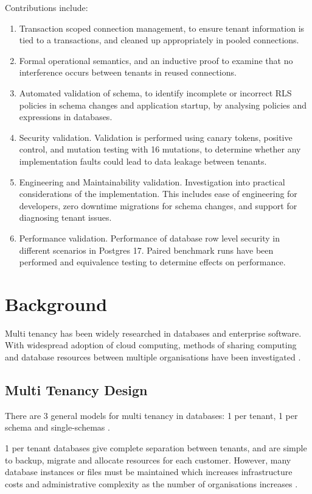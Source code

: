 \documentclass[conference]{IEEEtran}
\begin{document}
Contributions include:
\begin{enumerate}
\item Transaction scoped connection management, to ensure tenant information is tied to a transactions, and cleaned up appropriately in pooled connections.
\item Formal operational semantics, and an inductive proof to examine that no interference occurs between tenants in reused connections.
\item Automated validation of schema, to identify incomplete or incorrect RLS policies in schema changes and application startup, by analysing policies and expressions in databases.
\item Security validation. Validation is performed using canary tokens, positive control, and mutation testing with 16 mutations, to determine whether any implementation faults could lead to data leakage between tenants.
\item Engineering and Maintainability validation. Investigation into practical considerations of the implementation. This includes ease of engineering for developers, zero downtime migrations for schema changes, and support for diagnosing tenant issues.
\item Performance validation. Performance of database row level security in different scenarios in Postgres 17. Paired benchmark runs have been performed and equivalence testing to determine effects on performance.
\end{enumerate}

\section{Background}
\label{sec:background}

Multi tenancy has been widely researched in databases and enterprise software. With widespread adoption of cloud computing, methods of sharing computing and database resources between multiple organisations have been investigated \cite{armbrust2010, bezemer2010}.

\subsection{Multi Tenancy Design}
There are 3 general models for multi tenancy in databases: 1 per tenant, 1 per schema and single-schemas \cite{chong2006, kabbedijk2015}.

1 per tenant databases give complete separation between tenants, and are simple to backup, migrate and allocate resources for each customer. However, many database instances or files must be maintained which increases infrastructure costs and administrative complexity as the number of organisations increases \cite{jacobs2007}.
\end{document}
